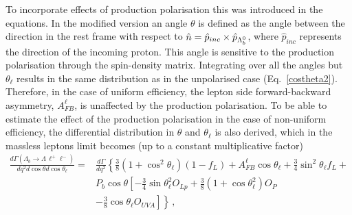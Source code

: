 To incorporate effects of production polarisation this was introduced in the equations.
%
In the modified version an angle $\theta$ is defined as the angle between the \Lz direction
in the \Lb rest frame with respect to $\hat{n} = \hat{p}_{inc} \times \hat{p}_{\Lambda^0_b}$, where $\hat{p}_{inc}$
represents the direction of the incoming proton. This angle is sensitive to the production polarisation
through the spin-density matrix. %
Integrating over all the angles but $\theta_\ell$ results in 
the same distribution as in the unpolarised case (Eq.~\ref{costheta2}). Therefore, in the case of uniform
efficiency, the lepton side forward-backward asymmetry, $A_{FB}^\ell$, is unaffected by the production
polarisation. To be able to estimate the effect of the production polarisation in the case of non-uniform efficiency, 
the differential distribution in $\theta$ and $\theta_\ell$ is also derived, which in the massless leptons
limit becomes (up to a  constant multiplicative factor)
%
\begin{align}
\frac{d\Gamma(\Lambda_{b}\to \Lambda \,\ell^{+}\ell^{-})}{dq^2d\cos\theta d\cos\theta_\ell}=&
\frac{d\Gamma}{dq^2}\left\{  \frac{3}{8}\left(1+\cos^2\theta_\ell\right)(1-f_L)+A_{FB}^\ell\cos\theta_\ell +
   \frac{3}{4}\sin^2\theta_\ell f_L+\right. \nonumber \\
&P_b\cos\theta\left[ -\frac{3}{4}\sin\theta_\ell^2O_{Lp}+
  \frac{3}{8}\left(1+\cos\theta_\ell^2\right)O_P\right. \nonumber \\
&\left.\left.-\frac{3}{8}\cos\theta_\ell O_{UVA} \right]\right\}\,,
\label{eq:lepton2D}
\end{align}

